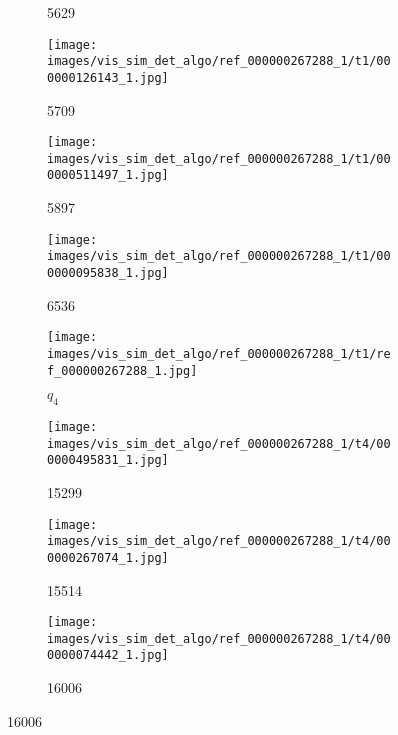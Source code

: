 \begin{figure}[h!]
\begin{subfigure}[b]{0.09\textwidth}
         \caption*{5629}     
         \label{fig:vis_sim_img_ex_1_7}
     \end{subfigure}  
     \begin{subfigure}[b]{0.09\textwidth}
         \centering
         \texttt{[image: images/vis\_sim\_det\_algo/ref\_000000267288\_1/t1/000000126143\_1.jpg]}
         \caption*{5709}         
         \label{fig:vis_sim_img_ex_1_8}
     \end{subfigure}  
     \hfill
     \begin{subfigure}[b]{0.09\textwidth}
         \centering
         \texttt{[image: images/vis\_sim\_det\_algo/ref\_000000267288\_1/t1/000000511497\_1.jpg]}
         \caption*{5897}                  
         \label{fig:vis_sim_img_ex_1_9}
     \end{subfigure}  
     \hfill
     \begin{subfigure}[b]{0.09\textwidth}
         \centering
         \texttt{[image: images/vis\_sim\_det\_algo/ref\_000000267288\_1/t1/000000095838\_1.jpg]}
         \caption*{6536}
         \label{fig:vis_sim_img_ex_1_10}
     \end{subfigure}  
     \hfill
    \begin{subfigure}[b]{0.09\textwidth}
         \centering
         \texttt{[image: images/vis\_sim\_det\_algo/ref\_000000267288\_1/t1/ref\_000000267288\_1.jpg]}
         \caption*{$q_4$}
         \label{fig:vis_sim_img_ex_2_1}
     \end{subfigure}  
     \begin{subfigure}[b]{0.09\textwidth}
         \centering
         \texttt{[image: images/vis\_sim\_det\_algo/ref\_000000267288\_1/t4/000000495831\_1.jpg]}
         \caption*{15299}
         \label{fig:vis_sim_img_ex_2_2}
     \end{subfigure}  
     \hfill
     \begin{subfigure}[b]{0.09\textwidth}
         \centering
         \texttt{[image: images/vis\_sim\_det\_algo/ref\_000000267288\_1/t4/000000267074\_1.jpg]}
         \caption*{15514}
         \label{fig:vis_sim_img_ex_2_3}
     \end{subfigure}  
     \hfill
     \begin{subfigure}[b]{0.09\textwidth}
         \centering
         \texttt{[image: images/vis\_sim\_det\_algo/ref\_000000267288\_1/t4/000000074442\_1.jpg]}
         \caption*{16006}         

\end{subfigure}
\end{figure}
